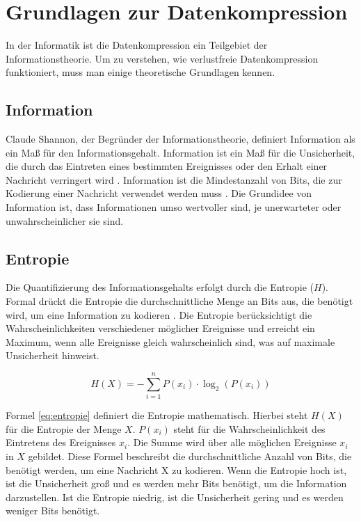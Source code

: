\documentclass[conference]{IEEEtran}
\begin{document}
\section{Grundlagen zur Datenkompression}

In der Informatik ist die Datenkompression ein Teilgebiet der Informationstheorie. 
Um zu verstehen, wie verlustfreie Datenkompression funktioniert, muss man einige 
theoretische Grundlagen kennen.

\subsection{Information}

Claude Shannon, der Begründer der Informationstheorie, definiert Information 
als ein Maß für den Informationsgehalt. 
Information ist ein Maß für die Unsicherheit, die durch das Eintreten eines bestimmten 
Ereignisses oder den Erhalt einer Nachricht verringert wird \cite{shannon}.  
Information ist die Mindestanzahl von Bits, die zur Kodierung einer Nachricht verwendet 
werden muss \cite{shannon2}.  
Die Grundidee von Information ist, dass Informationen umso wertvoller sind, je 
unerwarteter oder unwahrscheinlicher sie sind.


\subsection{Entropie}

Die Quantifizierung des Informationsgehalts erfolgt durch die Entropie ($H$).
Formal drückt die Entropie die durchschnittliche Menge an Bits aus,
die benötigt wird, um eine Information zu kodieren \cite{shannon}. 
Die Entropie berücksichtigt die Wahrscheinlichkeiten verschiedener möglicher
Ereignisse und erreicht ein Maximum, wenn alle Ereignisse gleich wahrscheinlich sind,
was auf maximale Unsicherheit hinweist.

\begin{equation}
  \label{eq:entropie}
  H(X) = -\sum_{i=1}^{n} P(x_i) \cdot \log_{2}(P(x_i))
\end{equation}

Formel \ref{eq:entropie} definiert die Entropie mathematisch.
Hierbei steht $H(X)$ für die Entropie der Menge $X$.
$P(x_i)$ steht für die Wahrscheinlichkeit des
Eintretens des Ereignisses $x_i$.
Die Summe wird über alle möglichen Ereignisse
$x_i$ in $X$ gebildet.
Diese Formel beschreibt die durchschnittliche Anzahl von Bits, die 
benötigt werden, um eine Nachricht X zu kodieren.
Wenn die Entropie hoch ist, ist die Unsicherheit groß und es werden mehr 
Bits benötigt, um die Information darzustellen. 
Ist die Entropie niedrig, ist die Unsicherheit gering und es werden weniger 
Bits benötigt. 
\end{document}

